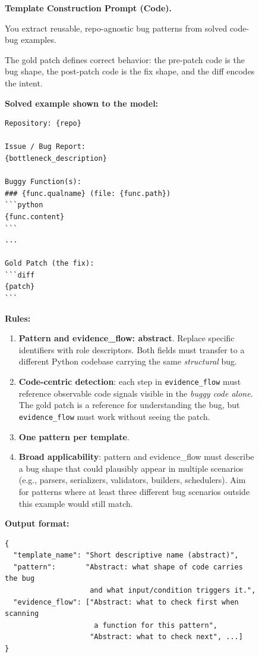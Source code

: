 \begin{figure}[!t]
\centering
\begin{tcolorbox}[colback=gray!5, colframe=gray!50,
                  boxrule=0.5pt, arc=2mm,
                  left=4pt, right=4pt, top=3pt, bottom=3pt]
\small
\textbf{Template Construction Prompt (Code).}

You extract reusable, repo-agnostic bug patterns from solved code-bug examples.

The gold patch defines correct behavior: the pre-patch code is the bug shape, the post-patch code is the fix shape, and the diff encodes the intent.

\medskip
\textbf{Solved example shown to the model:}
\begin{verbatim}
Repository: {repo}

Issue / Bug Report:
{bottleneck_description}

Buggy Function(s):
### {func.qualname} (file: {func.path})
```python
{func.content}
```
...

Gold Patch (the fix):
```diff
{patch}
```
\end{verbatim}

\medskip
\textbf{Rules:}
\begin{enumerate}[topsep=0pt, itemsep=0ex, parsep=0pt, left=14pt]
  \item \textbf{Pattern and evidence\_flow: abstract}. Replace specific identifiers with role descriptors. Both fields must transfer to a different Python codebase carrying the same \emph{structural} bug.
  \item \textbf{Code-centric detection}: each step in \texttt{evidence\_flow} must reference observable code signals visible in the \emph{buggy code alone}. The gold patch is a reference for understanding the bug, but \texttt{evidence\_flow} must work without seeing the patch.
  \item \textbf{One pattern per template}.
  \item \textbf{Broad applicability}: pattern and evidence\_flow must describe a bug shape that could plausibly appear in multiple scenarios (e.g., parsers, serializers, validators, builders, schedulers). Aim for patterns where at least three different bug scenarios outside this example would still match.
\end{enumerate}

\medskip
\textbf{Output format:}
\begin{verbatim}
{
  "template_name": "Short descriptive name (abstract)",
  "pattern":       "Abstract: what shape of code carries the bug
                    and what input/condition triggers it.",
  "evidence_flow": ["Abstract: what to check first when scanning
                     a function for this pattern",
                    "Abstract: what to check next", ...]
}
\end{verbatim}


\end{tcolorbox}
\end{figure}
